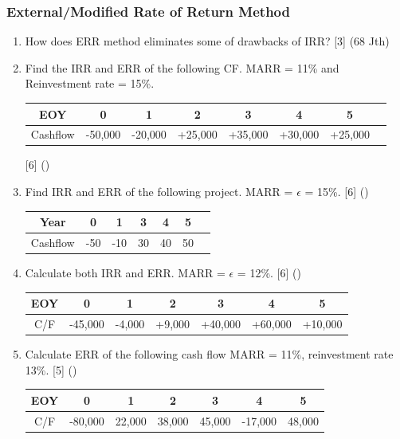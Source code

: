 \documentclass[12pt]{article}
\begin{document}
		\subsubsection{External/Modified Rate of Return Method}
			\begin{enumerate}[topsep = 0pt]
				\item How does ERR method eliminates some of drawbacks of IRR? \hfill [3] (68 Jth)
				
				\item Find the IRR and ERR of the following CF. MARR = 11\% and Reinvestment rate = 15\%.
				\begin{tabular}{|c|c|c|c|c|c|c|c|}
					\hline
					EOY & 0 & 1 & 2 & 3 & 4 & 5\\ \hline
					Cashflow & -50,000 & -20,000 & +25,000 & +35,000 & +30,000 & +25,000\\ \hline
				\end{tabular} \hfill [6] ()

				\item Find IRR and ERR of the following project. MARR = $\epsilon$ = 15\%. \hfill [6] ()
				\begin{tabular}{|c|c|c|c|c|c|c|}
					\hline
					Year & 0 & 1 & 3 & 4 & 5\\ \hline
					Cashflow & -50 & -10 & 30 & 40 & 50\\ \hline
				\end{tabular}
				
				\item Calculate both IRR and ERR. MARR = $\epsilon$ = 12\%. \hfill [6] ()
				\begin{tabular}{|c|c|c|c|c|c|c|}
					\hline
					EOY & 0 & 1 & 2 & 3 & 4 & 5\\ \hline
					C/F & -45,000 & -4,000 & +9,000 & +40,000 & +60,000 & +10,000 \\ \hline
				\end{tabular}
				
				\item Calculate ERR of the following cash flow MARR = 11\%, reinvestment rate 13\%. \hfill [5] ()
				\begin{tabular}{|c|c|c|c|c|c|c|}
					\hline
					EOY & 0 & 1 & 2 & 3 & 4 & 5 \\ \hline
					C/F & -80,000 & 22,000 & 38,000 & 45,000 & -17,000 & 48,000 \\ 
					\hline
				\end{tabular}
				

\end{enumerate}
\end{document}
